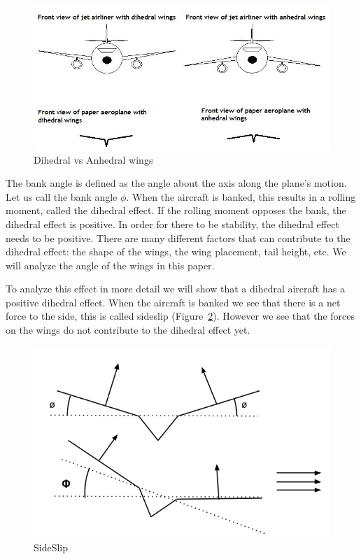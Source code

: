 \begin{figure}[hl]
  \centering
    \includegraphics[scale=.5]{figures/dihedraleffect.png}
    \caption{Dihedral vs Anhedral wings}
  \label{fig:dihedraleffect}
\end{figure}

The bank angle is defined as the angle about the axis along
the plane's motion. Let us call the bank angle $\phi$. When the aircraft is
banked, this results in a rolling moment, called the dihedral effect. If the
rolling moment opposes the bank, the dihedral effect is positive. In order for
there to be stability, the dihedral effect needs to be positive. There are many
different factors that can contribute to the dihedral effect: the shape of the wings,
the wing placement, tail height, etc. We will analyze the angle of the wings in this paper.

To analyze this effect in more detail we will show that a dihedral aircraft has 
a positive dihedral effect. When the aircraft is banked we see that there is a net force
to the side, this is called sideslip (Figure~\ref{fig:dihedral1}). 
However we see that the forces on the wings do not 
contribute to the dihedral effect yet.


\begin{figure}[hl]
  \centering
    \includegraphics[scale=.5]{figures/dihedral1.png}
    \caption{SideSlip}
  \label{fig:dihedral1}
\end{figure}

